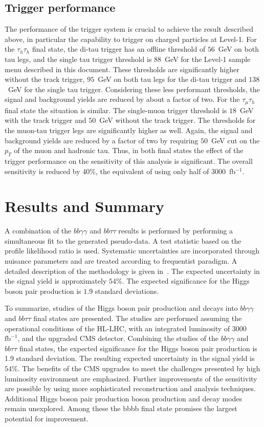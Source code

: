 \subsection{Trigger performance}
The performance of the trigger system is crucial to achieve the result
described above, in particular the capability to trigger on charged
particles at Level-1. For the $\tau_{h}\tau_{h}$ final state, the
di-tau trigger has an offline threshold of $56$~GeV on both tau legs,
and the single tau trigger threshold is $88$~GeV for the Level-1 sample menu
described in this document. These thresholds are significantly higher
without the track trigger, $95$~GeV on both tau legs for the di-tau
trigger and $138$~GeV for the single tau trigger. Considering these less
performant thresholds, the signal and background yields are reduced by about a factor of
two. For the $\tau_{\mu}\tau_{h}$ final state the situation is similar. The single-muon trigger
threshold is $18$~GeV with the track trigger and $50$~GeV without the track
trigger. The thresholds for the muon-tau trigger legs are significantly
higher as well. Again, the signal and background yields are reduced by a factor of two
by requiring $50$~GeV cut on the $p_T$ of the muon and hadronic tau.
Thus, in both final states the effect of the trigger performance on the sensitivity of this analysis is significant. The overall sensitivity is
reduced by 40\%, the equivalent of  using only half of 3000~fb$^{-1}$.

\section{Results and Summary}
A combination of the  $bb\gamma\gamma$ and $bb\tau\tau$ results is performed by performing a simultaneous fit to the generated pseudo-data. A test statistic based on the profile likelihood ratio is used. Systematic uncertainties are incorporated through nuisance parameters and are treated according to frequentist paradigm. A detailed description of the methodology is given in~\cite{CMS-NOTE-2011-005,Chatrchyan201226}. The expected uncertainty in the signal yield is approximately $54\%$. The expected significance for the Higgs boson pair production is $1.9$ standard deviations.  

To summarize, studies  of the Higgs boson pair production and decays into $bb\gamma\gamma$ and $bb\tau\tau$ final states are presented. The studies are performed assuming the operational conditions of the HL-LHC, with an integrated luminosity of 3000~$\mathrm{fb}^{-1}$, and the upgraded CMS detector. Combining the studies of the  $bb\gamma\gamma$ and $bb\tau\tau$ final states, the expected significance for the Higgs boson pair production is 1.9 standard deviation. The resulting expected uncertainty in the signal yield is $54\%$.  The benefits of the CMS \phasetwo upgrades to meet the challenges presented by high luminosity environment are emphasized. Further improvements of the sensitivity are possible by using more sophisticated reconstruction and analysis techniques. Additional Higgs boson pair production boson production and decay modes remain unexplored. Among these the bbbb final state promises the largest potential for improvement.

